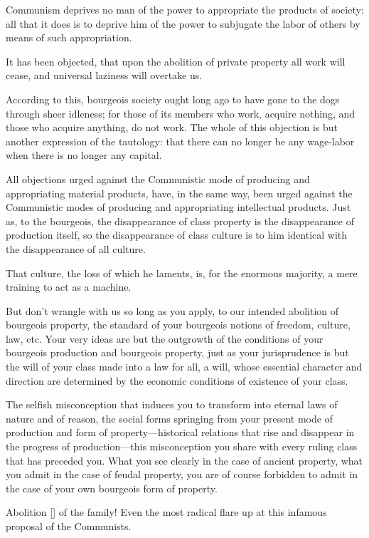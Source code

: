 Communism deprives no man of the power to appropriate the products of society: all that it does is to deprive him of the power to subjugate the labor of others by means of such appropriation.

It has been objected, that upon the abolition of private property all work will cease, and universal laziness will overtake us.

According to this, bourgeois society ought long ago to have gone to the dogs through sheer idleness; for those of its members who work, acquire nothing, and those who acquire anything, do not work. The whole of this objection is but another expression of the tautology: that there can no longer be any wage-labor when there is no longer any capital.

All objections urged against the Communistic mode of producing and appropriating material products, have, in the same way, been urged against the Communistic modes of producing and appropriating intellectual products. Just as, to the bourgeois, the disappearance of class property is the disappearance of production itself, so the disappearance of class culture is to him identical with the disappearance of all culture.

That culture, the loss of which he laments, is, for the enormous majority, a mere training to act as a machine.

But don't wrangle with us so long as you apply, to our intended abolition of bourgeois property, the standard of your bourgeois notions of freedom, culture, law, etc. Your very ideas are but the outgrowth of the conditions of your bourgeois production and bourgeois property, just as your jurisprudence is but the will of your class made into a law for all, a will, whose essential character and direction are determined by the economic conditions of existence of your class.

The selfish misconception that induces you to transform into eternal laws of nature and of reason, the social forms springing from your present mode of production and form of property—historical relations that rise and disappear in the progress of production—this misconception you share with every ruling class that has preceded you. What you see clearly in the case of ancient property, what you admit in the case of feudal property, you are of course forbidden to admit in the case of your own bourgeois form of property.

Abolition [] of the family! Even the most radical flare up at this infamous proposal of the Communists.

